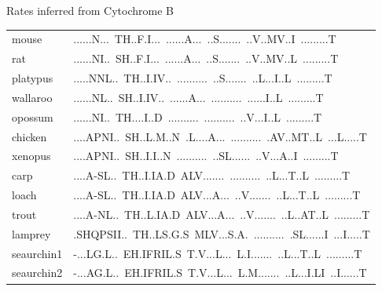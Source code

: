 \documentclass[bluish,slideColor,colorBG,pdf]{prosper}
\begin{document}
\begin{slide}[Replace]{Rates inferred from Cytochrome B}
{\begin{tabular}{l l}
mouse&......N...\ TH..F.I...\ ......A...\ ..S.......\ ..V..MV..I\ .........T\\
rat&......NI..\ SH..F.I...\ ......A...\ ..S.......\ ..V..MV..L\ .........T\\
platypus&.....NNL..\ TH..I.IV..\ ..........\ ..S.......\ ..L...I..L\ .........T\\
wallaroo&......NL..\ SH..I.IV..\ ......A...\ ..........\ ......I..L\ .........T\\
opossum&......NI..\ TH....I..D\ ..........\ ..........\ ..V...I..L\ .........T\\
chicken&....APNI..\ SH..L.M..N\ .L....A...\ ..........\ .AV..MT..L\ ...L.....T\\
xenopus&....APNI..\ SH..I.I..N\ ..........\ ..SL......\ ..V...A..I\ .........T\\
carp&....A-SL..\ TH..I.IA.D\ ALV.......\ ..........\ ..L...T..L\ .........T\\
loach&....A-SL..\ TH..I.IA.D\ ALV...A...\ ..V.......\ ..L...T..L\ .........T\\
trout&....A-NL..\ TH..L.IA.D\ ALV...A...\ ..V.......\ ..L..AT..L\ .........T\\
lamprey&.SHQPSII..\ TH..LS.G.S\ MLV...S.A.\ ..........\ .SL......I\ ...I.....T\\
seaurchin1&-...LG.L..\ EH.IFRIL.S\ T.V...L...\ L.I.......\ ..L...T..L\ .........T\\
seaurchin2&-...AG.L..\ EH.IFRIL.S\ T.V...L...\ L.M.......\ ..L...I.LI\ ..I......T\\
\end{tabular}
}

\end{slide}
\end{document}
